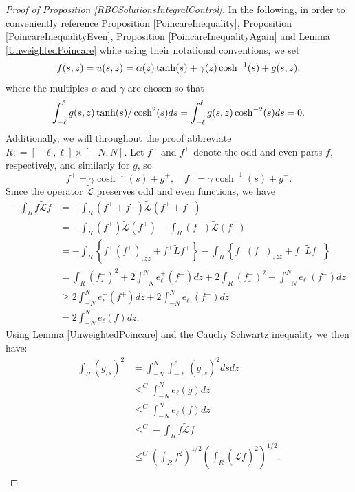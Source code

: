 \documentclass{amsart}
\newcommand{\mc}{\mathcal}
\newcommand{\wt}{\widetilde}
\begin{document}
\begin{proof}[Proof of Proposition  \ref{RBCSolutionsIntegralControl}]
In the following, in order to conveniently reference  Proposition \ref{PoincareInequality}, Proposition \ref{PoincareInequalityEven}, Proposition \ref{PoincareInequalityAgain} and Lemma \ref{UnweightedPoincare} while using their notational conventions, we set
\begin{align} \notag
f (s,z) = u(s, z) = \alpha(z) \tanh(s)  + \gamma(z) \cosh^{-1}(s)+ g(s, z),
\end{align}
where the multiples $\alpha$ and $\gamma$ are chosen so that 
\begin{align} \notag
\int_{-\ell}^{ \ell} g(s,z) \tanh(s)/\cosh^2(s) ds = \int_{-\ell}^{ \ell} g(s,z)  \cosh^{-2}(s) ds = 0.
\end{align}
Additionally, we will throughout the proof abbreviate $R: = [-\ell, \ell] \times [-N, N]$.  Let $f^{-}$ and $f^{+}$ denote the odd and even parts $f$, respectively, and similarly for $g$, so 
\[
f^{+} = \gamma \cosh^{-1}(s) + g^{+}, \quad  f^{-} = \gamma \cosh^{-1}(s) + g^{-}.
\]
Since the operator $\wt{\mc{L}}$ preserves odd and even functions, we have
\begin{align*}
- \int_{R} f \wt{\mc{L}} f  & = - \int_{R} (f^+ + f^-) \wt{\mc{L}} (f^+ + f^-)\\
& =   - \int_{R} (f^+) \wt{\mc{L}} (f^+)  - \int_{R} (f^-) \wt{\mc{L}} ( f^-) \\
& = -\int_{R} \left\{f^+\left(f^+\right)_{,zz} + f^+ \wt{L} f^+ \right\}  -\int_{R} \left\{f^-\left(f^-\right)_{,zz} + f^- \wt{L} f^- \right\} \\
& = \int_{R}\left(f^+_{z} \right)^2 + 2 \int_{-N}^N e^{+}_{\ell}(f^+) dz  + 2 \int_{R}\left(f^-_{z} \right)^2 + \int_{-N}^N e^{-}_{\ell}(f^-) dz \\
& \geq 2 \int_{-N}^N e^{+}_{\ell}(f^+) dz + 2 \int_{-N}^N e^{-}_{\ell}(f^-) dz \\
& = 2 \int_{-N}^N e_{\ell}(f) dz.
\end{align*}
Using  Lemma \ref{UnweightedPoincare} and the Cauchy Schwartz inequality  we then have:
\begin{align*}
\int_{R} \left(g_{, s}\right)^2 & = \int_{-N}^N \int_{-\ell}^\ell  \left(g_{, s}\right)^2 ds dz \\
& \leq^C  \int_{-N}^N e_{\ell}(g) dz \\
& \leq^C \int_{-N}^N e_{\ell}(f) dz \\ 
& \leq^C - \int_{R} f \wt{\mc{L}}  f \\
& \leq^C \left( \int_{R} f^2 \right)^{1/2}  \left( \int_{R} \left(\wt{\mc{L}}f\right)^2 \right)^{1/2}. \\

\end{align*}
\end{proof}
\end{document}
